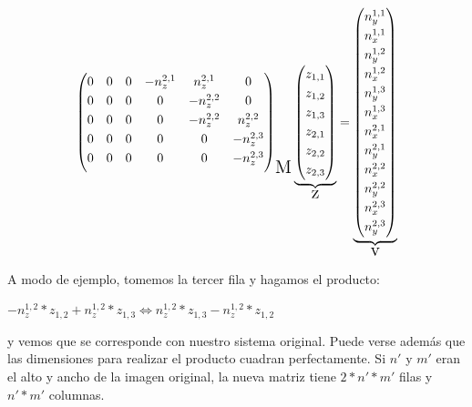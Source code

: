 \[{\begin{pmatrix}
    0 & 0 & 0 & - n_{z}^{2,1}  &  n_{z}^{2,1} & 0       \\[3pt]
    0 & 0 & 0 & 0 & - n_{z}^{2,2}  & 0                  \\[3pt]
    0 & 0 & 0 & 0 & - n_{z}^{2,2}  &  n_{z}^{2,2}         \\[3pt]
    0 & 0 & 0 & 0 & 0 & - n_{z}^{2,3}          \\[3pt]
    0 & 0 & 0 & 0 & 0 & - n_{z}^{2,3}         \\[3pt]
\end{pmatrix}}_{\text{\Large{M}}}
\underbrace{\begin{pmatrix}
    z_{1, 1} \\[3pt]
    z_{1, 2} \\[3pt]
    z_{1, 3} \\[3pt]
    z_{2, 1} \\[3pt]
    z_{2, 2} \\[3pt]
    z_{2, 3}
\end{pmatrix}}_{\text{\Large{z}}}
=
\underbrace{\begin{pmatrix}
    n_{y}^{1, 1} \\[3pt]
    n_{x}^{1, 1} \\[3pt]
    n_{y}^{1, 2} \\[3pt]
    n_{x}^{1, 2} \\[3pt]
    n_{y}^{1, 3} \\[3pt]
    n_{x}^{1, 3} \\[3pt]
    n_{x}^{2, 1} \\[3pt]
    n_{y}^{2, 1} \\[3pt]
    n_{x}^{2, 2} \\[3pt]
    n_{y}^{2, 2} \\[3pt]
    n_{x}^{2, 3} \\[3pt]
    n_{y}^{2, 3}
\end{pmatrix}}_{\text{\Large{v}}}
\]

\newpage
A modo de ejemplo, tomemos la tercer fila y hagamos el producto:

\begin{center}
    $-n_{z}^{1, 2} * z_{1,2} + n_{z}^{1, 2} * z_{1, 3} \iff n_{z}^{1, 2} * z_{1, 3} -n_{z}^{1, 2} * z_{1,2}$
\end{center}

y vemos que se corresponde con nuestro sistema original. Puede verse además que las dimensiones para realizar el producto cuadran perfectamente. Si $n'$ y $m'$ eran el alto y ancho de la imagen original, la nueva matriz tiene $2*n'*m'$ filas y $n'*m'$ columnas.

